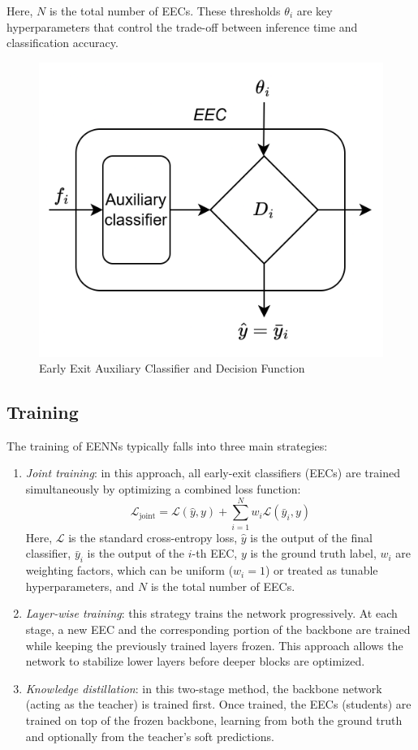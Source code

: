 Here, $N$ is the total number of EECs. 
These thresholds $\theta_i$ are key hyperparameters that control the trade-off between inference time and classification accuracy.
\begin{figure}[H]
    \centering
    \includegraphics[width=0.4\linewidth]{images/eeai12.png}
    \caption{Early Exit Auxiliary Classifier and Decision Function}
\end{figure}

\subsection{Training}
The training of EENNs typically falls into three main strategies:
\begin{enumerate}
    \item \textit{Joint training}: in this approach, all early-exit classifiers (EECs) are trained simultaneously by optimizing a combined loss function:
        \[\mathcal{L}_{\text{joint}}=\mathcal{L}(\hat{y},y)+\sum_{i=1}^{N}w_i\mathcal{L}(\bar{y}_i,y)\]
        Here, $\mathcal{L}$ is the standard cross-entropy loss, $\hat{y}$ is the output of the final classifier, $\bar{y}_i$ is the output of the $i$-th EEC, $y$ is the ground truth label, $w_i$ are weighting factors, which can be uniform ($w_i=1$) or treated as tunable hyperparameters, and $N$ is the total number of EECs.
    \item \textit{Layer-wise training}: this strategy trains the network progressively. 
        At each stage, a new EEC and the corresponding portion of the backbone are trained while keeping the previously trained layers frozen. 
        This approach allows the network to stabilize lower layers before deeper blocks are optimized.
    \item \textit{Knowledge distillation}: in this two-stage method, the backbone network (acting as the teacher) is trained first.
        Once trained, the EECs (students) are trained on top of the frozen backbone, learning from both the ground truth and optionally from the teacher's soft predictions.
\end{enumerate}

